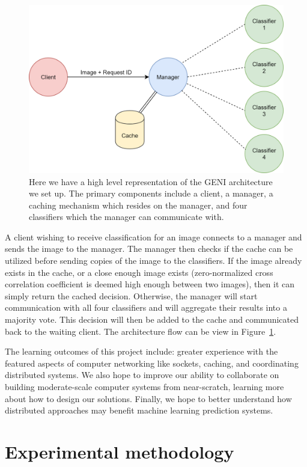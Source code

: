 \documentclass[12pt]{article}
\begin{document}
\begin{figure}
    \centering
    \includegraphics[scale=0.15]{networksArchitecture.png}
    \caption{Here we have a high level representation of the GENI architecture we set up. The primary components include a client, a manager, a caching mechanism which resides on the manager, and four classifiers which the manager can communicate with.}
    \label{fig:architecture}
\end{figure}

A client wishing to receive classification for an image connects to a manager and sends the image to the manager. The manager then checks if the cache can be utilized before sending copies of the image to the classifiers. If the image already exists in the cache, or a close enough image exists (zero-normalized cross correlation coefficient is deemed high enough between two images), then it can simply return the cached decision. Otherwise, the manager will start communication with all four classifiers and will aggregate their results into a majority vote. This decision will then be added to the cache and communicated back to the waiting client. The architecture flow can be view in Figure~\ref{fig:architecture}.

The learning outcomes of this project include: greater experience with the featured aspects of computer networking like sockets, caching, and coordinating distributed systems.
We also hope to improve our ability to collaborate on building moderate-scale computer systems from near-scratch, learning more about how to design our solutions.
Finally, we hope to better understand how distributed approaches may benefit machine learning prediction systems.

\section{Experimental methodology}
\end{document}
